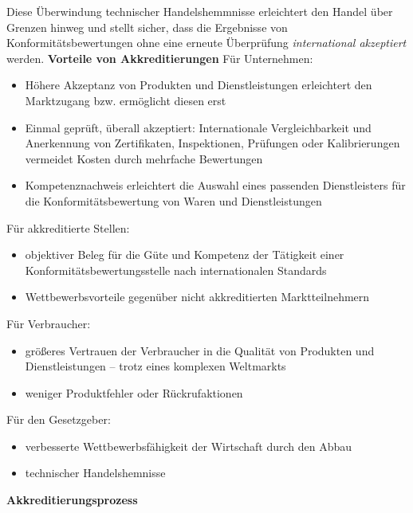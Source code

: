 Diese Überwindung technischer Handelshemmnisse erleichtert den Handel über Grenzen hinweg und stellt sicher, dass die Ergebnisse von Konformitätsbewertungen ohne eine erneute Überprüfung \textit{international akzeptiert} werden.
\newpage
\textbf{Vorteile von Akkreditierungen}\newline
Für Unternehmen:
\begin{itemize}
\item Höhere Akzeptanz von Produkten und Dienstleistungen erleichtert den Marktzugang bzw. ermöglicht diesen erst
\item Einmal geprüft, überall akzeptiert: Internationale Vergleichbarkeit und Anerkennung von Zertifikaten, Inspektionen, Prüfungen oder Kalibrierungen vermeidet Kosten durch mehrfache Bewertungen
\item Kompetenznachweis erleichtert die Auswahl eines passenden Dienstleisters für die Konformitätsbewertung von Waren und Dienstleistungen
\end{itemize}
Für akkreditierte Stellen: 
\begin{itemize}
\item objektiver Beleg für die Güte und Kompetenz der Tätigkeit einer Konformitäts\-bewertungs\-stelle nach internationalen Standards
\item Wettbewerbsvorteile gegenüber nicht akkreditierten Marktteilnehmern
\end{itemize}
Für Verbraucher:
\begin{itemize}
\item größeres Vertrauen der Verbraucher in die Qualität von Produkten und Dienstleistungen – trotz eines komplexen Weltmarkts
\item weniger Produktfehler oder Rückrufaktionen
\end{itemize}
Für den Gesetzgeber: 
\begin{itemize}
\item verbesserte Wettbewerbsfähigkeit der Wirtschaft durch den Abbau \item technischer Handelshemnisse
\end{itemize}
\textbf{Akkreditierungsprozess}
